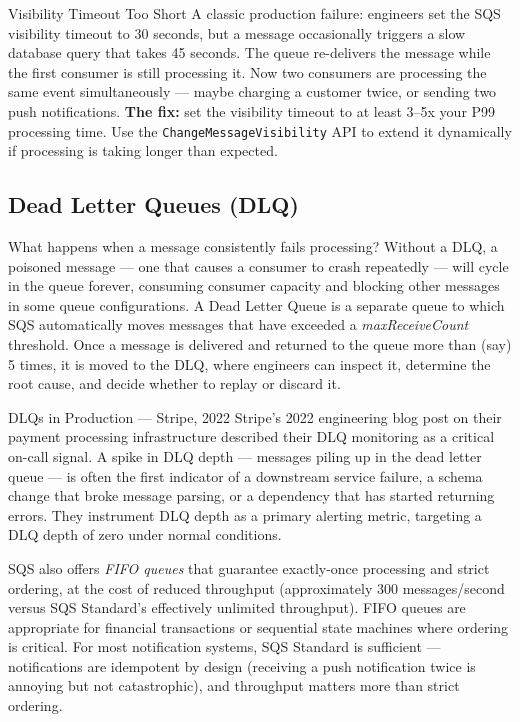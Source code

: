 \documentclass[11pt,a4paper]{article}
\begin{document}
\begin{trapbox}{Visibility Timeout Too Short}
A classic production failure: engineers set the SQS visibility timeout to 30 seconds, but a message occasionally triggers a slow database query that takes 45 seconds. The queue re-delivers the message while the first consumer is still processing it. Now two consumers are processing the same event simultaneously --- maybe charging a customer twice, or sending two push notifications. \textbf{The fix:} set the visibility timeout to at least 3--5x your P99 processing time. Use the \texttt{ChangeMessageVisibility} API to extend it dynamically if processing is taking longer than expected.
\end{trapbox}

\subsection{Dead Letter Queues (DLQ)}

What happens when a message consistently fails processing? Without a DLQ, a poisoned message --- one that causes a consumer to crash repeatedly --- will cycle in the queue forever, consuming consumer capacity and blocking other messages in some queue configurations. A Dead Letter Queue is a separate queue to which SQS automatically moves messages that have exceeded a \textit{maxReceiveCount} threshold. Once a message is delivered and returned to the queue more than (say) 5 times, it is moved to the DLQ, where engineers can inspect it, determine the root cause, and decide whether to replay or discard it.

\begin{industrybox}{DLQs in Production --- Stripe, 2022}
Stripe's 2022 engineering blog post on their payment processing infrastructure described their DLQ monitoring as a critical on-call signal. A spike in DLQ depth --- messages piling up in the dead letter queue --- is often the first indicator of a downstream service failure, a schema change that broke message parsing, or a dependency that has started returning errors. They instrument DLQ depth as a primary alerting metric, targeting a DLQ depth of zero under normal conditions.
\end{industrybox}

SQS also offers \textit{FIFO queues} that guarantee exactly-once processing and strict ordering, at the cost of reduced throughput (approximately 300 messages/second versus SQS Standard's effectively unlimited throughput). FIFO queues are appropriate for financial transactions or sequential state machines where ordering is critical. For most notification systems, SQS Standard is sufficient --- notifications are idempotent by design (receiving a push notification twice is annoying but not catastrophic), and throughput matters more than strict ordering.
\end{document}
